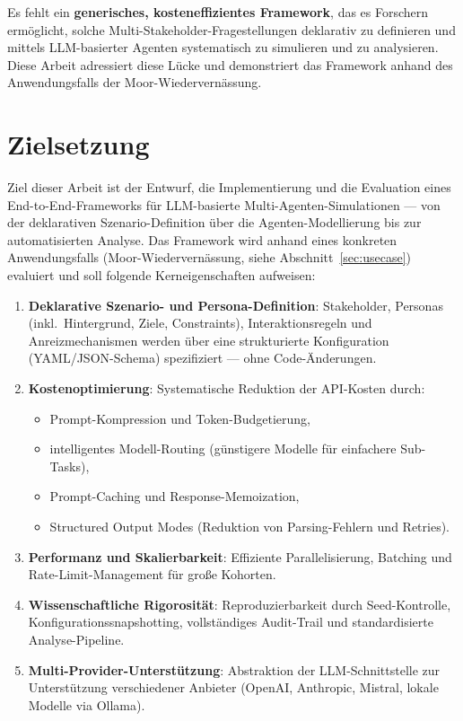 \documentclass[12pt, a4paper]{article}
\begin{document}
Es fehlt ein \textbf{generisches, kosteneffizientes Framework}, das es Forschern ermöglicht, solche Multi-Stakeholder-Fragestellungen deklarativ zu definieren und mittels LLM-basierter Agenten systematisch zu simulieren und zu analysieren. Diese Arbeit adressiert diese Lücke und demonstriert das Framework anhand des Anwendungsfalls der Moor-Wiedervernässung.

\section{Zielsetzung}

Ziel dieser Arbeit ist der Entwurf, die Implementierung und die Evaluation eines End-to-End-Frameworks für LLM-basierte Multi-Agenten-Simulationen --- von der deklarativen Szenario-Definition über die Agenten-Modellierung bis zur automatisierten Analyse. Das Framework wird anhand eines konkreten Anwendungsfalls (Moor-Wiedervernässung, siehe Abschnitt~\ref{sec:usecase}) evaluiert und soll folgende Kerneigenschaften aufweisen:

\begin{enumerate}
    \item \textbf{Deklarative Szenario- und Persona-Definition}: Stakeholder, Personas (inkl.\ Hintergrund, Ziele, Constraints), Interaktionsregeln und Anreizmechanismen werden über eine strukturierte Konfiguration (YAML/JSON-Schema) spezifiziert --- ohne Code-Änderungen.

    \item \textbf{Kostenoptimierung}: Systematische Reduktion der API-Kosten durch:
    \begin{itemize}
        \item Prompt-Kompression und Token-Budgetierung,
        \item intelligentes Modell-Routing (günstigere Modelle für einfachere Sub-Tasks),
        \item Prompt-Caching und Response-Memoization,
        \item Structured Output Modes (Reduktion von Parsing-Fehlern und Retries).
    \end{itemize}

    \item \textbf{Performanz und Skalierbarkeit}: Effiziente Parallelisierung, Batching und Rate-Limit-Management für große Kohorten.

    \item \textbf{Wissenschaftliche Rigorosität}: Reproduzierbarkeit durch Seed-Kontrolle, Konfigurationssnapshotting, vollständiges Audit-Trail und standardisierte Analyse-Pipeline.

    \item \textbf{Multi-Provider-Unterstützung}: Abstraktion der LLM-Schnittstelle zur Unterstützung verschiedener Anbieter (OpenAI, Anthropic, Mistral, lokale Modelle via Ollama).
\end{enumerate}
\end{document}
